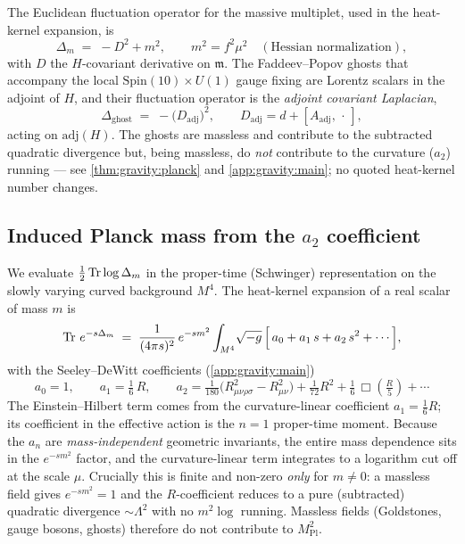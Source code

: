 The Euclidean fluctuation operator for the massive multiplet, used in the
heat-kernel expansion, is
\begin{equation}\label{eq:gravity:Deltam}
  \Delta_{m} \;=\; -D^{2} + m^{2}, \qquad m^{2}=f^{2}\mu^{2}
  \quad(\text{Hessian normalization}),
\end{equation}
with $D$ the $H$-covariant derivative on $\mathfrak m$. The Faddeev--Popov
ghosts that accompany the local $\mathrm{Spin}(10)\times U(1)$ gauge fixing
are Lorentz scalars in the adjoint of $H$, and their fluctuation operator is
the \emph{adjoint covariant Laplacian},
\begin{equation}\label{eq:gravity:ghost}
  \Delta_{\mathrm{ghost}} \;=\; -\bigl(D_{\mathrm{adj}}\bigr)^{2},
  \qquad
  D_{\mathrm{adj}} = d + [A_{\mathrm{adj}},\,\cdot\,] ,
\end{equation}
acting on $\mathrm{adj}(H)$. The ghosts are massless and contribute to the
subtracted quadratic divergence but, being massless, do \emph{not}
contribute to the curvature ($a_{2}$) running --- see
\autoref{thm:gravity:planck} and \autoref{app:gravity:main}; no quoted
heat-kernel number changes.

\subsection{Induced Planck mass from the $a_{2}$ coefficient}
\label{sec:gravity:planck}

We evaluate $\tfrac12\operatorname{Tr}\log\Delta_{m}$ in the proper-time (Schwinger)
representation on the slowly varying curved background $M^{4}$. The
heat-kernel expansion of a real scalar of mass $m$ is
\begin{equation}\label{eq:gravity:hk}
  \operatorname{Tr}\, e^{-s\Delta_{m}}
  \;=\;
  \frac{1}{(4\pi s)^{2}}\, e^{-s m^{2}}
  \int_{M^{4}}\!\sqrt{-g}\,
  \Bigl[\,a_{0} + a_{1}\,s + a_{2}\,s^{2} + \cdots\,\Bigr],
\end{equation}
with the Seeley--DeWitt coefficients (\autoref{app:gravity:main})
\begin{equation}\label{eq:gravity:a2}
  a_{0} = 1, \qquad
  a_{1} = \tfrac{1}{6}\,R, \qquad
  a_{2} = \tfrac{1}{180}\bigl(R_{\mu\nu\rho\sigma}^{2} - R_{\mu\nu}^{2}\bigr)
        + \tfrac{1}{72}R^{2} + \tfrac{1}{6}\,\Box\!\left(\tfrac{R}{5}\right)+\cdots
\end{equation}
The Einstein--Hilbert term comes from the curvature-linear coefficient
$a_{1}=\tfrac16 R$; its coefficient in the effective action is the
$n=1$ proper-time moment. Because the $a_{n}$ are
\emph{mass-independent} geometric invariants, the entire mass dependence
sits in the $e^{-sm^{2}}$ factor, and the curvature-linear term integrates
to a logarithm cut off at the scale $\mu$. Crucially this is finite and
non-zero \emph{only} for $m\neq 0$: a massless field gives $e^{-s m^{2}}=1$
and the $R$-coefficient reduces to a pure (subtracted) quadratic divergence
$\sim\Lambda^{2}$ with no $m^{2}\log$ running. Massless fields (Goldstones,
gauge bosons, ghosts) therefore do not contribute to $M_{\mathrm{Pl}}^{2}$.

